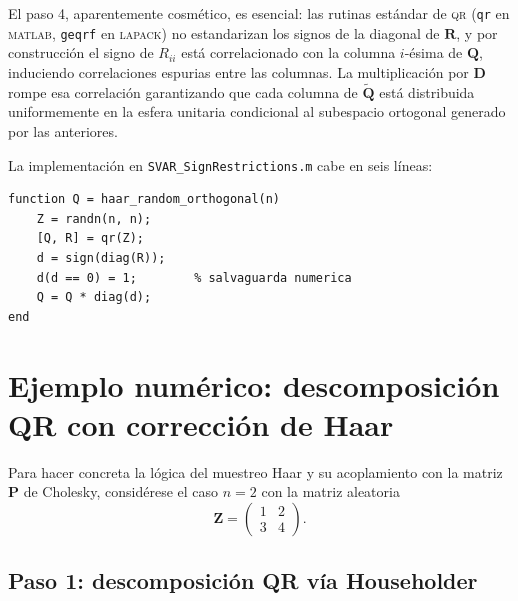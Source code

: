 \documentclass[11pt,letterpaper]{article}
\begin{document}
El paso 4, aparentemente cosmético, es esencial: las rutinas estándar de \textsc{qr} (\texttt{qr} en \textsc{matlab}, \texttt{geqrf} en \textsc{lapack}) no estandarizan los signos de la diagonal de $\bm{R}$, y por construcción el signo de $R_{ii}$ está correlacionado con la columna $i$-ésima de $\bm{Q}$, induciendo correlaciones espurias entre las columnas. La multiplicación por $\bm{D}$ rompe esa correlación garantizando que cada columna de $\tilde{\bm{Q}}$ está distribuida uniformemente en la esfera unitaria condicional al subespacio ortogonal generado por las anteriores.

La implementación en \texttt{SVAR\_SignRestrictions.m} cabe en seis líneas:

\begin{lstlisting}[style=matlabstyle, caption={Generación de matriz ortogonal Haar-uniforme}]
function Q = haar_random_orthogonal(n)
    Z = randn(n, n);
    [Q, R] = qr(Z);
    d = sign(diag(R));
    d(d == 0) = 1;        % salvaguarda numerica
    Q = Q * diag(d);
end
\end{lstlisting}

\section{Ejemplo numérico: descomposición QR con corrección de Haar}\label{sec:qr}

Para hacer concreta la lógica del muestreo Haar y su acoplamiento con la matriz $\bm{P}$ de Cholesky, considérese el caso $n=2$ con la matriz aleatoria
\begin{equation}
\bm{Z} = \begin{pmatrix} 1 & 2 \\ 3 & 4 \end{pmatrix}.
\end{equation}

\subsection{Paso 1: descomposición QR vía Householder}
\end{document}
